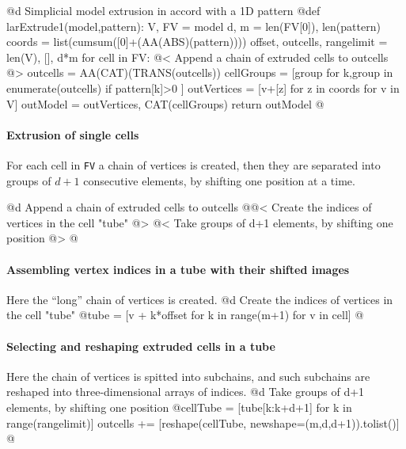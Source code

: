 \documentclass[11pt,oneside]{article}	%
\begin{document}
@d Simplicial model extrusion in accord with a 1D pattern
@{def larExtrude1(model,pattern):
    V, FV = model
    d, m = len(FV[0]), len(pattern)
    coords = list(cumsum([0]+(AA(ABS)(pattern))))
    offset, outcells, rangelimit = len(V), [], d*m
    for cell in FV:
        @< Append a chain of extruded cells to outcells @>
    outcells = AA(CAT)(TRANS(outcells))
    cellGroups = [group for k,group in enumerate(outcells) if pattern[k]>0 ]
    outVertices = [v+[z] for z in coords for v in V]
    outModel = outVertices, CAT(cellGroups)
    return outModel
@}

\paragraph{Extrusion of single cells}
For each cell in \texttt{FV} a chain of vertices is created, then they are separated into groups of $d+1$ consecutive elements, by shifting one position at a time.

@d Append a chain of extruded cells to outcells
@{@< Create the indices of vertices in the cell "tube" @>
@< Take groups of d+1 elements, by shifting one position @>	
@}

\paragraph{Assembling vertex indices in a tube with their shifted images}
Here the ``long'' chain of vertices is created.
@d Create the indices of vertices in the cell "tube"
@{tube = [v + k*offset for k in range(m+1) for v in cell]	@}

\paragraph{Selecting and reshaping extruded cells in a tube}
Here the chain of vertices is spitted into subchains, and such subchains are reshaped into three-dimensional arrays of indices.
@d Take groups of d+1 elements, by shifting one position
@{cellTube = [tube[k:k+d+1] for k in range(rangelimit)]
outcells += [reshape(cellTube, newshape=(m,d,d+1)).tolist()]	@}
\end{document}
